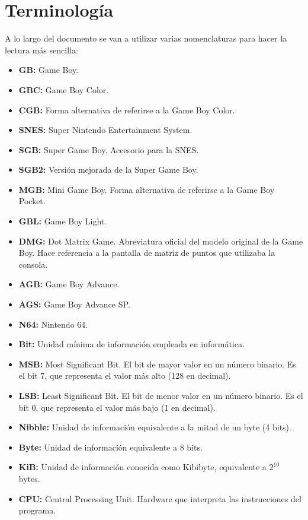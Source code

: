 \chapter{Terminología}
\label{terminologia}
A lo largo del documento se van a utilizar varias nomenclaturas para hacer la lectura más sencilla:
\begin{itemize}
	\item \textbf{GB:} Game Boy.
    \item \textbf{GBC:} Game Boy Color.
    \item \textbf{CGB:} Forma alternativa de referirse a la Game Boy Color.
    \item \textbf{SNES:} Super Nintendo Entertainment System.
    \item \textbf{SGB:} Super Game Boy. Accesorio para la SNES.
    \item \textbf{SGB2:} Versión mejorada de la Super Game Boy.
    \item \textbf{MGB:} Mini Game Boy. Forma alternativa de referirse a la Game Boy Pocket.
    \item \textbf{GBL:} Game Boy Light.
    \item \textbf{DMG:} Dot Matrix Game. Abreviatura oficial del modelo original de la Game Boy. Hace referencia a la pantalla de matriz de puntos que utilizaba la consola.
    \item \textbf{AGB:} Game Boy Advance.
    \item \textbf{AGS:} Game Boy Advance SP.
    \item \textbf{N64:} Nintendo 64.
	\item \textbf{Bit:} Unidad mínima de información empleada en informática.
    \item \textbf{MSB:} Most Significant Bit. El bit de mayor valor en un número binario. Es el bit 7, que representa el valor más alto (128 en decimal).
    \item \textbf{LSB:} Least Significant Bit. El bit de menor valor en un número binario. Es el bit 0, que representa el valor más bajo (1 en decimal).
    \item \textbf{Nibble:} Unidad de información equivalente a la mitad de un byte (4 bits).
	\item \textbf{Byte:} Unidad de información equivalente a 8 bits.
    \item \textbf{KiB:} Unidad de información conocida como Kibibyte, equivalente a $2^{10}$ bytes.
	\item \textbf{CPU:} Central Processing Unit. Hardware que interpreta las instrucciones del programa.

\end{itemize}
